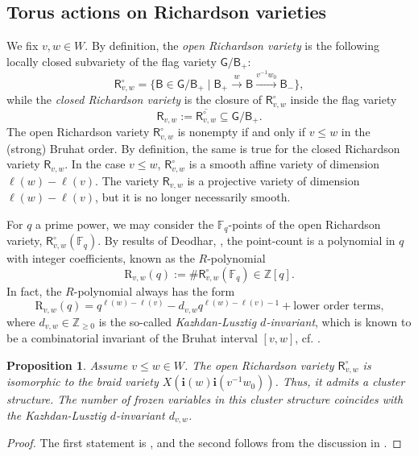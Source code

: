 \documentclass[a4paper, 11pt]{amsart}
\newcommand{\borel}{\mathsf{B}}
\newcommand{\orich}[1]{\mathsf{R}^{\circ}_{#1}}
\newcommand{\rich}[1]{\mathsf{R}_{#1}}
\newcommand{\rpoly}[1]{\mathrm{R}_{#1}}
\newcommand{\rel}[1]{\xrightarrow{#1}}
\newcommand{\word}[1]{\mathbf{#1}}
\newcommand{\group}{\mathsf{G}}
\newcommand{\wo}{w_{0}}
\newcommand{\F}{\mathbb{F}}
\newcommand{\Z}{\mathbb{Z}}
\newtheorem{proposition}[theorem]{Proposition}%
\theoremstyle{definition}
\begin{document}
\subsection{Torus actions on Richardson varieties} We fix $v, w \in W$. By definition, the \emph{open Richardson variety} is the following locally closed subvariety of the flag variety $\group/\borel_{+}$:
\begin{equation}\label{eq:open-richardson}
\orich{v,w} = \{\borel \in \group/\borel_{+} \mid \borel_{+} \rel{w} \borel \rel{v^{-1}\wo} \borel_{-}\},
\end{equation}
while the \emph{closed Richardson variety} is the closure of $\orich{v,w}$ inside the flag variety
\[
\rich{v,w} := \overline{\orich{v,w}} \subseteq \group/\borel_+.
\]
The open Richardson variety $\orich{v,w}$ is nonempty if and only if $v \leq w$ in the (strong) Bruhat order. By definition, the same is true for the closed Richardson variety $\rich{v,w}$. In the case $v \leq w$, $\orich{v,w}$ is a smooth affine variety of dimension $\ell(w) - \ell(v)$. The variety $\rich{v,w}$ is a projective variety of dimension $\ell(w) - \ell(v)$, but it is no longer necessarily smooth.

For $q$ a prime power, we may consider the $\F_q$-points of the open Richardson variety, $\orich{v,w}(\F_q)$. By results of Deodhar, \cite{Deodhar}, the point-count is a polynomial in $q$ with integer coefficients, known as the $R$-polynomial \cite{KazhdanLusztig}
\[
\rpoly{v,w}(q) := \#\orich{v,w}(\F_q) \in \Z[q].
\]
In fact, the $R$-polynomial always has the form
\[
\rpoly{v,w}(q) = q^{\ell(w) - \ell(v)} - d_{v,w}q^{\ell(w) - \ell(v) - 1} + \text{lower order terms,}
\]
where $d_{v,w} \in \Z_{\geq 0}$ is the so-called \emph{Kazhdan-Lusztig $d$-invariant}, which is known to be a combinatorial invariant of the Bruhat interval $[v, w]$, cf. \cite{BarkleyGaetzLam, patimo}.


\begin{proposition}\label{prop:KL-d-invariant}
    Assume $v \leq w \in W$. The open Richardson variety $\orich{v,w}$ is isomorphic to the braid variety $X(\word{i}(w)\word{i}(v^{-1}w_0))$. Thus, it admits a cluster structure. The number of frozen variables in this cluster structure coincides with the Kazhdan-Lusztig $d$-invariant $d_{v,w}$. 
\end{proposition}
\begin{proof}
The first statement is \cite[Theorem 3.14]{CGGLSS}, and the second follows from the discussion in \cite[Section 3.4]{hypercubes}.
\end{proof}
\end{document}
